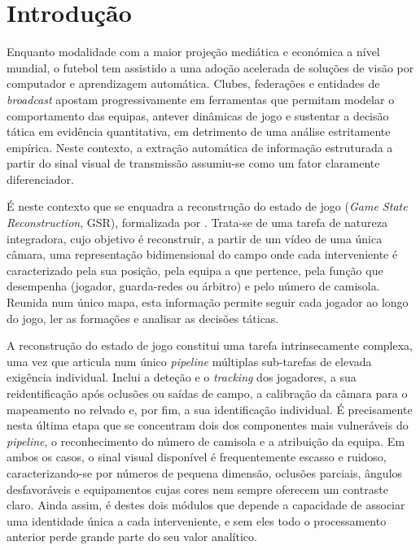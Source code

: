 \chapter{Introdução}\label{cap:introducao}

Enquanto modalidade com a maior projeção mediática e económica a nível mundial, o futebol tem
assistido a uma adoção acelerada de soluções de visão por computador e aprendizagem automática.
Clubes, federações e entidades de \emph{broadcast} apostam progressivamente em ferramentas que
permitam modelar o comportamento das equipas, antever dinâmicas de jogo e sustentar a decisão
tática em evidência quantitativa, em detrimento de uma análise estritamente empírica. Neste
contexto, a extração automática de informação estruturada a partir do sinal visual de transmissão
assumiu-se como um fator claramente diferenciador.

É neste contexto que se enquadra a reconstrução do estado de jogo (\emph{Game State
Reconstruction}, GSR), formalizada por \citet{somers2024soccernet}. Trata-se de uma tarefa de
natureza integradora, cujo objetivo é reconstruir, a partir de um vídeo de uma única câmara, uma
representação bidimensional do campo onde cada interveniente é caracterizado pela sua posição, pela
equipa a que pertence, pela função que desempenha (jogador, guarda-redes ou árbitro) e pelo número
de camisola. Reunida num único mapa, esta informação permite seguir cada jogador ao longo do jogo,
ler as formações e analisar as decisões táticas.

A reconstrução do estado de jogo constitui uma tarefa intrinsecamente complexa, uma vez que articula
num único \emph{pipeline} múltiplas sub-tarefas de elevada exigência individual. Inclui a deteção e
o \emph{tracking} dos jogadores, a sua reidentificação após oclusões ou saídas de campo, a
calibração da câmara para o mapeamento no relvado e, por fim, a sua identificação individual. É
precisamente nesta última etapa que se concentram dois dos componentes mais vulneráveis do
\emph{pipeline}, o reconhecimento do número de camisola e a atribuição da equipa. Em ambos os
casos, o sinal visual disponível é frequentemente escasso e ruidoso, caracterizando-se por números
de pequena dimensão, oclusões parciais, ângulos desfavoráveis e equipamentos cujas cores nem sempre
oferecem um contraste claro. Ainda assim, é destes dois módulos que depende a capacidade de associar uma identidade única a cada
interveniente, e sem eles todo o processamento anterior perde grande parte do seu valor analítico.

